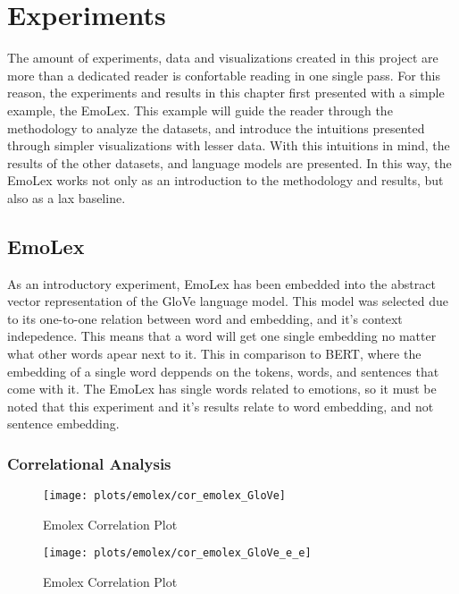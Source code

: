 \chapter{Experiments}\label{chap:Experiments}
The amount of experiments, data and visualizations created in this project are more than a dedicated reader is confortable reading in one single pass. For this reason, the experiments and results in this chapter first presented with a simple example, the EmoLex. This example will guide the reader through the methodology to analyze the datasets, and introduce the intuitions presented through simpler visualizations with lesser data. With this intuitions in mind, the results of the other datasets, and language models are presented. In this way, the EmoLex works not only as an introduction to the methodology and results, but also as a lax baseline.

\section{EmoLex}\label{sec:EmoLex}
As an introductory experiment, EmoLex has been embedded into the abstract vector representation of the GloVe language model. This model was selected due to its one-to-one relation between word and embedding, and it's context indepedence. This means that a word will get one single embedding no matter what other words apear next to it. This in comparison to BERT, where the embedding of a single word deppends on the tokens, words, and sentences that come with it. The EmoLex has single words related to emotions, so it must be noted that this experiment and it's results relate to word embedding, and not sentence embedding.

\subsection{Correlational Analysis}

\begin{figure}[H]
  \texttt{[image: plots/emolex/cor\_emolex\_GloVe]}
  \centering
  \caption{Emolex Correlation Plot}
\end{figure}\label{fig:cor_emolex_GloVe}

\begin{figure}[H]
  \texttt{[image: plots/emolex/cor\_emolex\_GloVe\_e\_e]}
  \centering
  \caption{Emolex Correlation Plot}
\end{figure}\label{fig:cor_emolex_GloVe_e_e}

